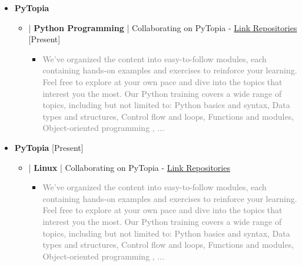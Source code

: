\documentclass[10pt,a4paper,sans]{moderncv} %
\begin{document}
        \begin{itemize}
		\item {} \textbf{PyTopia }    
		\vspace{0.5em}

      \begin{itemize}
       \item{} | \textbf{Python Programming} | Collaborating on PyTopia - {\href{https://github.com/pytopia}{Link Repositories}} \hfill[Present]
        
		\begin{itemize}
			\item \textcolor{gray}{We've organized the content into easy-to-follow modules, each containing hands-on examples and exercises to reinforce your learning. Feel free to explore at your own pace and dive into the topics that interest you the most. Our Python training covers a wide range of topics, including but not limited to: Python basics and syntax, Data types and structures, Control flow and loops, Functions and modules, Object-oriented programming , ...} 

			\end{itemize}	
				
 		\end{itemize}
     \end{itemize}
             \begin{itemize}
		\item {} \textbf{PyTopia }   \hfill[Present] 
		\vspace{0.5em}

      \begin{itemize}
       \item{} | \textbf{Linux} | Collaborating on PyTopia - \href{https://github.com/pytopia}{Link Repositories}
        
		\begin{itemize}
			\item \textcolor{gray}{We've organized the content into easy-to-follow modules, each containing hands-on examples and exercises to reinforce your learning. Feel free to explore at your own pace and dive into the topics that interest you the most. Our Python training covers a wide range of topics, including but not limited to: Python basics and syntax, Data types and structures, Control flow and loops, Functions and modules, Object-oriented programming , ...}




			\end{itemize}	
				
		\end{itemize}
  
		\end{itemize}
\end{document}
